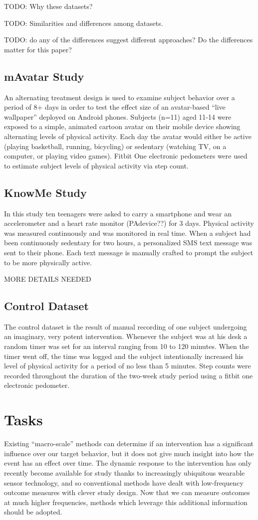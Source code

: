 \documentclass[review,journal]{vgtc}         %
\begin{document}
TODO: Why these datasets?

TODO: Similarities and differences among datasets.

TODO: do any of the differences suggest different approaches?  Do the differences matter for this paper?

\subsection{mAvatar Study}
An alternating treatment design is used to examine subject behavior over a period of 8+ days in order to test the effect size of an avatar-based “live wallpaper” deployed on Android phones.
Subjects (n=11) aged 11-14 were exposed to a simple, animated cartoon avatar on their mobile device showing alternating levels of physical activity.
Each day the avatar would either be active (playing basketball, running, bicycling) or sedentary (watching TV, on a computer, or playing video games).
Fitbit One electronic pedometers were used to estimate subject levels of physical activity via step count.

\subsection{KnowMe Study}
In this study ten teenagers were asked to carry a smartphone and wear an accelerometer and a heart rate monitor (PAdevice??) for 3 days.
Physical activity was measured continuously and was monitored in real time.
When a subject had been continuously sedentary for two hours, a personalized SMS text message was sent to their phone.
Each text message is manually crafted to prompt the subject to be more physically active.

MORE DETAILS NEEDED

\subsection{Control Dataset}
The control dataset is the result of manual recording of one subject undergoing an imaginary, very potent intervention.
Whenever the subject was at his desk a random timer was set for an interval ranging from 10 to 120 minutes.
When the timer went off, the time was logged and the subject intentionally increased his level of physical activity for a period of no less than 5 minutes.
Step counts were recorded throughout the duration of the two-week study period using a fitbit one electronic pedometer.

\section{Tasks}
Existing “macro-scale” methods can determine if an intervention has a significant influence over our target behavior, but it does not give much insight into how the event has an effect over time.
The dynamic response to the intervention has only recently become available for study thanks to increasingly ubiquitous wearable sensor technology, and so conventional methods have dealt with low-frequency outcome measures with clever study design.
Now that we can measure outcomes at much higher frequencies, methods which leverage this additional information should be adopted.
\end{document}
